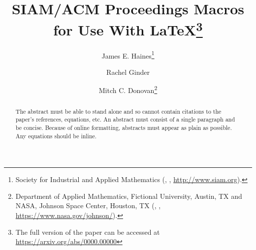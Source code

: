 \documentclass[twoside,leqno,twocolumn]{article}
\begin{document}
%
\newcommand\relatedversion{}
\renewcommand\relatedversion{\thanks{The full version of the paper can be accessed at \protect\url{https://arxiv.org/abs/0000.00000}}} %

\title{\Large SIAM/ACM Proceedings Macros for Use With LaTeX\relatedversion}
    \author{James E. Haines\thanks{Society for Industrial and Applied Mathematics (, , \url{http://www.siam.org}).}
    \and Rachel Ginder\footnotemark[2]    
    \and Mitch C. Donovan\thanks{Department of Applied Mathematics, Fictional University, Austin, TX and NASA, Johnson Space Center, Houston, TX
  (, , \url{https://www.nasa.gov/johnson/}).}}

\date{}

\maketitle







\begin{abstract} The abstract must be able to stand alone and so cannot contain citations to the paper's references, equations, etc.  An abstract must consist of a single paragraph and be concise. Because of online formatting, abstracts must appear as plain as possible. Any equations should be inline.
\end{abstract}
\end{document}
